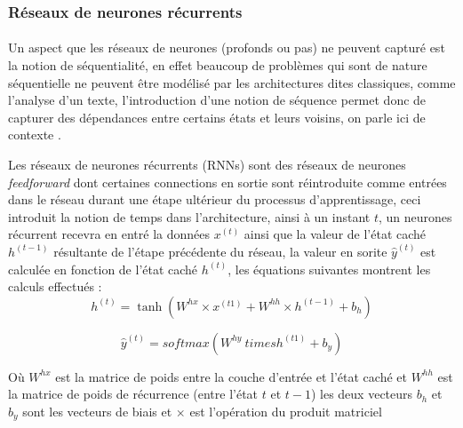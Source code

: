 		\subsubsection{Réseaux de neurones récurrents}
		\paragraph{}
		Un aspect que les réseaux de neurones (profonds ou pas) ne peuvent capturé est la notion de séquentialité, en effet beaucoup de problèmes qui sont de nature séquentielle ne peuvent être modélisé par les architectures dites classiques, comme l'analyse d'un texte, l'introduction d'une notion de séquence permet donc de capturer des dépendances entre certains états et leurs voisins, on parle ici de contexte \cite{rnn_lstms}.
		\par 
		Les réseaux de neurones récurrents (RNNs) sont des réseaux de neurones \textit{feedforward} dont certaines connections en sortie sont réintroduite comme entrées dans le réseau durant une étape ultérieur du processus d'apprentissage, ceci introduit la notion de temps dans l'architecture, ainsi à un instant $t$, un neurones récurrent recevra en entré la données $x^{(t)}$ ainsi que la valeur de l'état caché $h^{(t-1)}$ résultante de l'étape précédente du réseau, la valeur en sorite $\hat{y}^{(t)}$ est calculée en fonction de l'état caché $h^{(t)}$, les équations suivantes montrent les calculs effectués :
		\begin{equation}
			h^{(t)} = \tanh(W^{hx} \times x^{(t1)} + W^{hh} \times h^{(t-1)} + b_h)
		\end{equation}
		
		\begin{equation}
			\hat{y}^{(t)} = softmax(W^{hy} \ times h^{(t1)} + b_y)
		\end{equation}
		
		Où $W^{hx}$ est la matrice de poids entre la couche d'entrée et l'état caché et $W^{hh}$ est la matrice de poids de récurrence (entre l'état $t$ et $t-1$) les deux vecteurs $b_h$ et $b_y$ sont les vecteurs de biais et $\times$ est l'opération du produit matriciel\cite{rnn_lstms}
		
